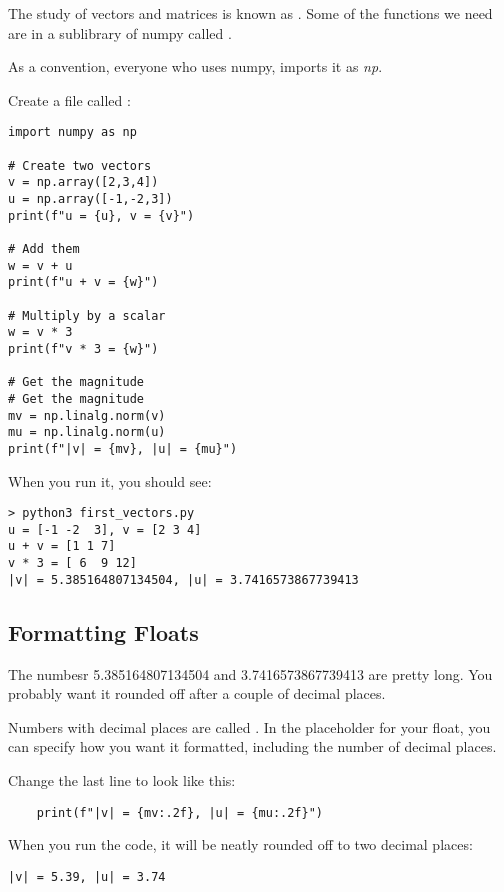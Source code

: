 The study of vectors and matrices is known as . Some of the functions we need
are in a sublibrary of numpy called . 

As a convention, everyone who uses numpy, imports it as \textit{np}. 

Create a file called :

\begin{Verbatim}
import numpy as np

# Create two vectors
v = np.array([2,3,4])
u = np.array([-1,-2,3])
print(f"u = {u}, v = {v}")

# Add them
w = v + u
print(f"u + v = {w}")

# Multiply by a scalar
w = v * 3
print(f"v * 3 = {w}")

# Get the magnitude
# Get the magnitude
mv = np.linalg.norm(v)
mu = np.linalg.norm(u)
print(f"|v| = {mv}, |u| = {mu}")
\end{Verbatim}

When you run it, you should see:

\begin{Verbatim}
> python3 first_vectors.py
u = [-1 -2  3], v = [2 3 4]
u + v = [1 1 7]
v * 3 = [ 6  9 12]
|v| = 5.385164807134504, |u| = 3.7416573867739413
\end{Verbatim}

\subsection{Formatting Floats}

The numbesr 5.385164807134504 and 3.7416573867739413 are pretty long.  You probably want it 
rounded off after a couple of decimal places.

Numbers with decimal places are called . In the placeholder for your float, you 
can specify how you want it formatted, including the number of decimal places.

Change the last line to look like this:
\begin{Verbatim}
    print(f"|v| = {mv:.2f}, |u| = {mu:.2f}")
\end{Verbatim}

When you run the code, it will be neatly rounded off to two decimal places:
\begin{Verbatim}
|v| = 5.39, |u| = 3.74
\end{Verbatim}
